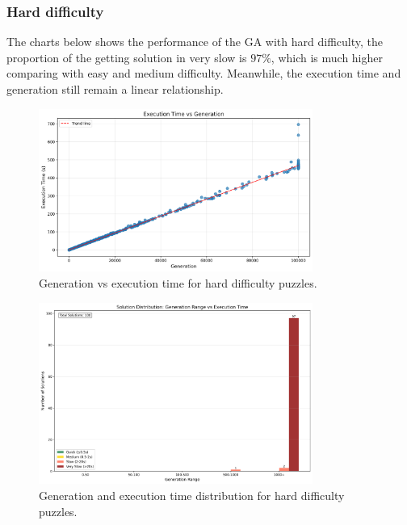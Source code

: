 \subsubsection{Hard difficulty}

The charts below shows the performance of the GA with hard difficulty, the proportion of the getting solution in very slow is $97\%$, which is much higher comparing with easy and medium difficulty.
Meanwhile, the execution time and generation still remain a linear relationship.

\begin{figure}[h]
\centering
\includegraphics[width=0.8\textwidth]{resources/generation_vs_execution_time_hard.png}
\caption{Generation vs execution time for hard difficulty puzzles.}
\label{fig:generation_vs_execution_time_hard}
\end{figure}

\begin{figure}[h]
\centering
\includegraphics[width=0.8\textwidth]{resources/generation_execution_time_bars_hard.png}
\caption{Generation and execution time distribution for hard difficulty puzzles.}
\label{fig:generation_execution_time_bars_hard}
\end{figure}

